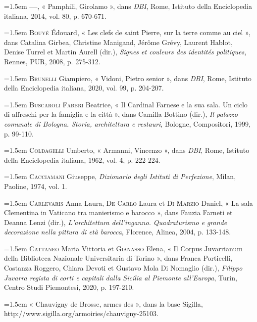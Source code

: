 \documentclass[12pt,twoside,openany]{book}
\newenvironment{PurhBibliography}
  {%
    \par
    \setlength{\parindent}{0pt}%
    \setlength{\leftskip}{0pt}%
  }
  {%
    \par
  }
\begin{document}
\begin{PurhBibliography}
\noindent\hangindent=1.5em \textbf{—}, « Pamphili, Girolamo », dans \textit{DBI}, Rome, Istituto della Enciclopedia italiana, 2014, vol. 80, p. 670-671.\par
\noindent\hangindent=1.5em \textsc{Bouyé} Édouard, « Les clefs de saint Pierre, sur la terre comme au ciel », dans Catalina Girbea, Christine Manigand, Jérôme Grévy, Laurent Hablot, Denise Turrel et Martin Aurell (dir.), \textit{Signes et couleurs des identités politiques}, Rennes, \textsc{PUR}, 2008, p. 275-312.\par
\noindent\hangindent=1.5em \textsc{Brunelli} Giampiero, « Vidoni, Pietro senior », dans \textit{DBI}, Rome, Istituto della Enciclopedia italiana, 2020, vol. 99, p. 204-207.\par
\noindent\hangindent=1.5em \textsc{Buscaroli Fabbri} Beatrice, « Il Cardinal Farnese e la sua sala. Un ciclo di affreschi per la famiglia e la città », dans Camilla Bottino (dir.), \textit{Il palazzo comunale di Bologna. Storia, architettura e restauri}, Bologne, Compositori, 1999, p. 99-110.\par
\noindent\hangindent=1.5em \textsc{Coldagelli} Umberto, « Armanni, Vincenzo », dans\textit{ DBI}, Rome, Istituto della Enciclopedia italiana, 1962, vol. 4, p. 222-224.\par
\noindent\hangindent=1.5em \textsc{Cacciamani} Giuseppe, \textit{Dizionario degli Istituti di Perfezione}, Milan, Paoline, 1974, vol. 1.\par
\noindent\hangindent=1.5em \textsc{Carlevaris} Anna Laura, D\textsc{e Carlo} Laura et \textsc{Di Marzio} Daniel, « La sala Clementina in Vaticano tra manierismo e barocco », dans Fauzia Farneti et Deanna Lenzi (dir.), \textit{L’architettura dell’inganno. Quadraturismo e grande decorazione nella pittura di età barocca}, Florence, Alinea, 2004, p. 133-148.\par
\noindent\hangindent=1.5em \textsc{Cattaneo} Maria Vittoria et \textsc{Gianasso} Elena, « Il Corpus Juvarrianum della Biblioteca Nazionale Universitaria di Torino », dans Franca Porticelli, Costanza Roggero, Chiara Devoti et Gustavo Mola Di Nomaglio (dir.), \textit{Filippo Juvarra regista di corti e capitali dalla Sicilia al Piemonte all’Europa}, Turin, Centro Studi Piemontesi, 2020, p. 197-210.\par
\noindent\hangindent=1.5em « Chauvigny de Brosse, armes des », dans la base Sigilla, http://www.sigilla.org/armoiries/chauvigny-25103.\par

\end{PurhBibliography}
\end{document}
